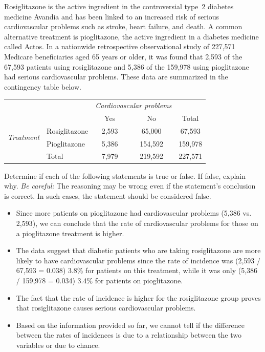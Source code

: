 Rosiglitazone is the active ingredient in the controversial type~2 diabetes medicine Avandia and has been linked to an increased risk of serious cardiovascular problems such as stroke, heart failure, and death. A common alternative treatment is pioglitazone, the active ingredient in a diabetes medicine called Actos. In a nationwide retrospective observational study of 227,571 Medicare beneficiaries aged  65 years or older, it was found that 2,593 of the 67,593 patients using rosiglitazone and 5,386 of the 159,978 using pioglitazone had serious cardiovascular problems. These data are summarized in the contingency table below. 
\begin{center}
\begin{tabular}{ll  cc c} 
								&				& \multicolumn{2}{c}{\textit{Cardiovascular problems}} \\
\cline{3-4}	
								&				& Yes 	& No 		& Total	\\
\cline{2-5}
\multirow{2}{*}{\textit{Treatment}}		& Rosiglitazone 	& 2,593	& 65,000		& 67,593 	\\
								& Pioglitazone		& 5,386 	& 154,592 	& 159,978\\
\cline{2-5}
								&Total			& 7,979	& 219,592		& 227,571
\end{tabular}
\end{center}
Determine if each of the following statements is true or false. If false, explain why. \textit{Be careful:} The reasoning may be wrong even if the statement's conclusion is correct. In such cases, the statement should be considered false.
\begin{itemize}
\item Since more patients on pioglitazone had cardiovascular problems (5,386 vs. 2,593), we can conclude that the rate of cardiovascular problems for those on a pioglitazone treatment is higher.
\item The data suggest that diabetic patients who are taking rosiglitazone are more likely to have cardiovascular problems since the rate of incidence was (2,593 / 67,593 = 0.038) 3.8\% for patients on this treatment, while it was only (5,386 / 159,978 = 0.034) 3.4\% for patients on pioglitazone.
\item The fact that the rate of incidence is higher for the rosiglitazone group proves that rosiglitazone causes serious cardiovascular problems.
\item Based on the information provided so far, we cannot tell if the difference between the rates of incidences is due to a relationship between the two variables or due to chance.
\end{itemize}

